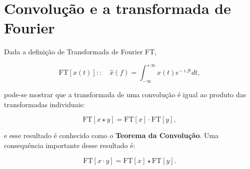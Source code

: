 \section{Convolução e a transformada de Fourier}

Dada a definição de Transformada de Fourier FT,

\begin{equation}
\text{FT}[x(t)]:: \quad \hat{x}(f) = \int_{-\infty}^{+\infty} x(t) e^{-\imath f t}d t,
\label{eq:ft}
\end{equation}

pode-se mostrar que a transformada de uma convolução é igual ao produto das transformadas individuais:

\begin{equation}
\text{FT}[x \star y] = \text{FT}[x] \cdot \text{FT}[y],
\end{equation}

e esse resultado é conhecido como o \textbf{Teorema da Convolução}. Uma consequência importante desse resultado é:

\begin{equation}
\text{FT}[x \cdot y] = \text{FT}[x] \star \text{FT}[y].
\end{equation}


